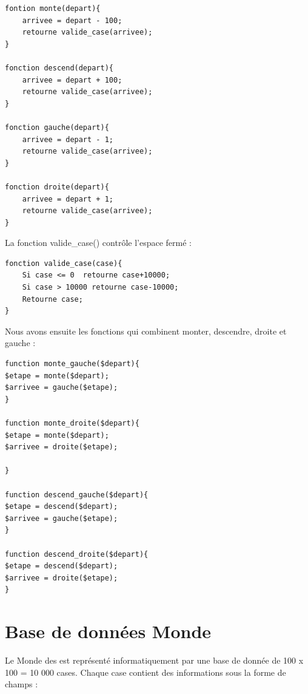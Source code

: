 \documentclass[french]{report}
\begin{document}
\begin{lstlisting}[frame = single,caption={Fonctions de déplacements dans 'Monde'}]
fontion monte(depart){
	arrivee = depart - 100;
	retourne valide_case(arrivee);
}

fonction descend(depart){
	arrivee = depart + 100;
	retourne valide_case(arrivee);
}

fonction gauche(depart){
	arrivee = depart - 1;
	retourne valide_case(arrivee);
}

fonction droite(depart){
	arrivee = depart + 1;
	retourne valide_case(arrivee);
}
\end{lstlisting}
La fonction valide\_case() contrôle l'espace fermé : \\
\begin{lstlisting}[frame = single,caption={Fonctions dans Monde}]
fonction valide_case(case){
	Si case <= 0  retourne case+10000;
	Si case > 10000 retourne case-10000;
	Retourne case;
}
\end{lstlisting}

Nous avons ensuite les fonctions qui combinent monter, descendre, droite et gauche : \\


\begin{lstlisting}[frame = single,caption={monde.php}]
function monte_gauche($depart){
$etape = monte($depart);
$arrivee = gauche($etape);
}

function monte_droite($depart){
$etape = monte($depart);
$arrivee = droite($etape);

}

function descend_gauche($depart){
$etape = descend($depart);
$arrivee = gauche($etape);
}

function descend_droite($depart){
$etape = descend($depart);
$arrivee = droite($etape);	
}
\end{lstlisting}

\section{Base de données \textbf{Monde}}\label{bd_monde}
Le Monde des \CoCiX est représenté informatiquement par une base de donnée de 100 x 100 = 10 000 cases.
Chaque case contient des informations sous la forme de champs :\\
\end{document}
